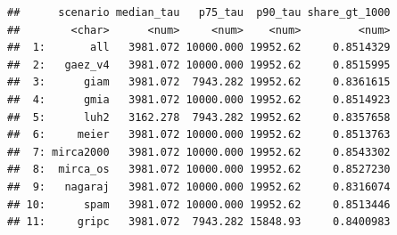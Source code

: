 \documentclass[
  11pt,
]{article}
\begin{document}
\begin{verbatim}
##      scenario median_tau   p75_tau  p90_tau share_gt_1000
##        <char>      <num>     <num>    <num>         <num>
##  1:       all   3981.072 10000.000 19952.62     0.8514329
##  2:   gaez_v4   3981.072 10000.000 19952.62     0.8515995
##  3:      giam   3981.072  7943.282 19952.62     0.8361615
##  4:      gmia   3981.072 10000.000 19952.62     0.8514923
##  5:      luh2   3162.278  7943.282 19952.62     0.8357658
##  6:     meier   3981.072 10000.000 19952.62     0.8513763
##  7: mirca2000   3981.072 10000.000 19952.62     0.8543302
##  8:  mirca_os   3981.072 10000.000 19952.62     0.8527230
##  9:   nagaraj   3981.072 10000.000 19952.62     0.8316074
## 10:      spam   3981.072 10000.000 19952.62     0.8513446
## 11:     gripc   3981.072  7943.282 15848.93     0.8400983
\end{verbatim}
\end{document}

